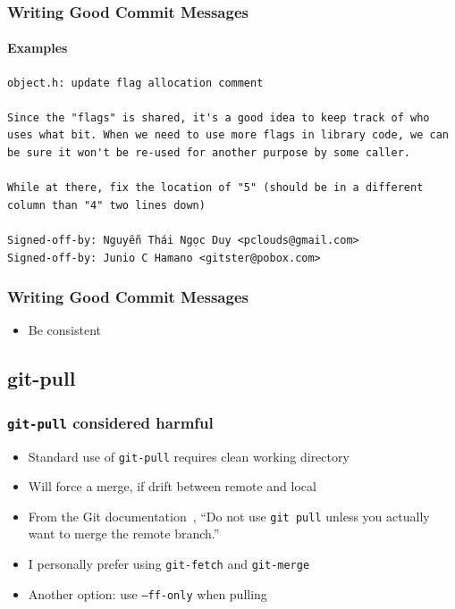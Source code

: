 \documentclass[]{beamer}
\begin{document}
\begin{frame}[fragile]
  \frametitle{Writing Good Commit Messages}
  \framesubtitle{Examples}
\begin{Verbatim}[fontsize=\scriptsize]
object.h: update flag allocation comment

Since the "flags" is shared, it's a good idea to keep track of who
uses what bit. When we need to use more flags in library code, we can
be sure it won't be re-used for another purpose by some caller.

While at there, fix the location of "5" (should be in a different
column than "4" two lines down)

Signed-off-by: Nguyễn Thái Ngọc Duy <pclouds@gmail.com>
Signed-off-by: Junio C Hamano <gitster@pobox.com>
\end{Verbatim}
\end{frame}

\begin{frame}
  \frametitle{Writing Good Commit Messages}
  \begin{itemize}
    \item{Be consistent}
  \end{itemize}
\end{frame}

\subsection{git-pull}
\begin{frame}[fragile]
\frametitle{\texttt{git-pull} considered harmful}
\begin{itemize}
\item{Standard use of \texttt{git-pull} requires clean working directory}
\item{Will force a merge, if drift between remote and local}
\item{From the Git documentation~\cite{website:gitworkflows7}, ``Do not use
\texttt{git pull} unless you actually want to merge the remote branch.''}
\item{I personally prefer using \texttt{git-fetch} and \texttt{git-merge}}
\item{Another option: use \texttt{--ff-only} when pulling}
\end{itemize}
\inputminted[label=\texttt{\~{}/.gitconfig}]{linuxconfig}{code/5/9}
\end{frame}
\end{document}
